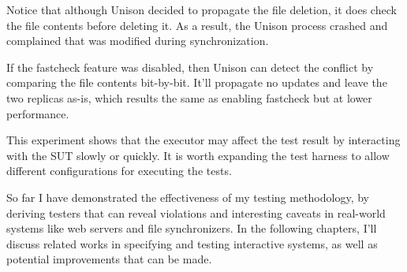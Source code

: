 Notice that although Unison decided to propagate the file deletion, it does
check the file contents before deleting it.  As a result, the Unison process
crashed and complained that  was modified during synchronization.

If the fastcheck feature was disabled, then Unison can detect the conflict by
comparing the file contents bit-by-bit.  It'll propagate no updates and leave
the two replicas as-is, which results the same as enabling fastcheck but at
lower performance.

This experiment shows that the executor may affect the test result by
interacting with the SUT slowly or quickly.  It is worth expanding the test
harness to allow different configurations for executing the tests.

So far I have demonstrated the effectiveness of my testing methodology, by
deriving testers that can reveal violations and interesting caveats in
real-world systems like web servers and file synchronizers.  In the following
chapters, I'll discuss related works in specifying and testing interactive
systems, as well as potential improvements that can be made.
